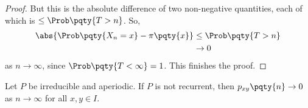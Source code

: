 \begin{proof}
    But this is the absolute difference of two non-negative quantities, each of which is \(\leq \Prob\pqty{T > n}\). So,
    \begin{align*}
        \abs{\Prob\pqty{X_n = x} - \pi\pqty{x}} &\leq \Prob\pqty{T > n} \\
        &\to 0
    \end{align*}
    as \(n \to \infty\), since \(\Prob\pqty{T < \infty} = 1\).
 This finishes the proof.
\end{proof}

\begin{theorem}
    Let \(P\) be irreducible and aperiodic. If \(P\) is not recurrent, then \(p_{xy} \pqty{n} \to 0\) as \(n \to \infty\) for all \(x, y \in I\).
\end{theorem}

